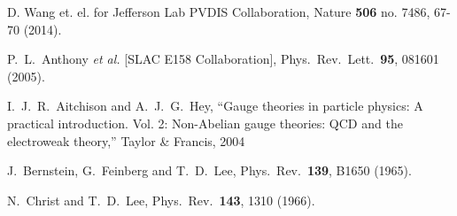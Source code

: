 \begin{thebibliography}{00}
  

  D. Wang et. el. for Jefferson Lab PVDIS Collaboration, 
  Nature {\bf 506} no. 7486, 67-70 (2014). 
   
  
  

  P.~L.~Anthony {\it et al.} [SLAC E158 Collaboration],
    Phys.\ Rev.\ Lett.\  {\bf 95}, 081601 (2005).
  
  

I.~J.~R.~Aitchison and A.~J.~G.~Hey,
``Gauge theories in particle physics: A practical introduction. Vol. 2: Non-Abelian gauge theories: QCD and the electroweak theory,'' Taylor \& Francis, 2004 


  J.~Bernstein, G.~Feinberg and T.~D.~Lee,
    Phys.\ Rev.\  {\bf 139}, B1650 (1965).
  
  

  N.~Christ and T.~D.~Lee,
    Phys.\ Rev.\  {\bf 143}, 1310 (1966).
  
  























































\end{thebibliography}
